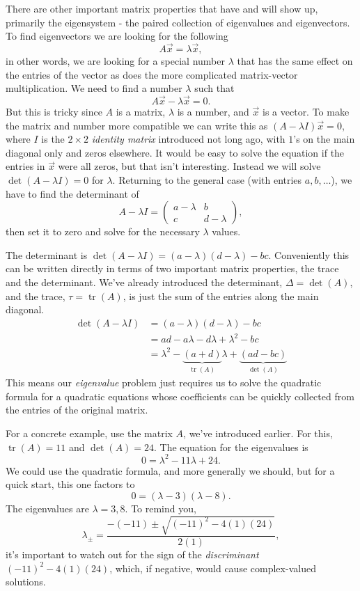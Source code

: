\documentclass{article}
\begin{document}
There are other important matrix properties that have and will show up, primarily the eigensystem - the paired collection of eigenvalues and eigenvectors.  To find eigenvectors we are looking for the following \[A\vec{x} = \lambda \vec{x},\] in other words, we are looking for a special number \(\lambda\) that has the same effect on the entries of the vector as does the more complicated matrix-vector multiplication.  We need to find a number \(\lambda\) such that \[A\vec{x} - \lambda\vec{x} = 0.\] But this is tricky since \(A\) is a matrix, \(\lambda\) is a number, and \(\vec{x}\) is a vector.  To make the matrix and number more compatible we can write this as \((A - \lambda I)\vec{x} = 0\), where \(I\) is the \(2\times2\) \emph{identity matrix}  introduced not long ago, with \(1\)'s on the main diagonal only and zeros elsewhere.  It would be easy to solve the equation if the entries in \(\vec{x}\) were all zeros, but that isn't interesting.  Instead we will solve \(\operatorname{det}(A-\lambda I) =0\) for \(\lambda\).  Returning to the general case (with entries \(a, b, \dots\)), we have to find the determinant of \[A-\lambda I = \begin{pmatrix}a - \lambda & b\\c & d - \lambda \end{pmatrix},\] then set it to zero and solve for the necessary \(\lambda\) values.

The determinant is \(\operatorname{det}(A-\lambda I) = (a-\lambda)(d-\lambda)-bc\).  Conveniently this can be written directly in terms of two important matrix properties, the trace and the determinant.  We've already introduced the determinant, \(\Delta = \operatorname{det}(A)\), and the trace, \(\tau = \operatorname{tr}(A)\), is just the sum of the entries along the main diagonal.  
\begin{align*}
\operatorname{det}(A-\lambda I) &= (a-\lambda)(d-\lambda)-bc\\
&= ad - a\lambda -d\lambda+ \lambda^2-bc\\
&=\lambda^2 - \underbrace{(a+d)}_{\operatorname{tr}(A)}\lambda + \underbrace{(ad-bc)}_{\operatorname{det}(A)}
\end{align*}
This means our \emph{eigenvalue} problem just requires us to solve the quadratic formula for a quadratic equations whose coefficients can be quickly collected from the entries of the original matrix.

For a concrete example, use the matrix \(A\), we've introduced earlier. For this, \(\operatorname{tr}(A) = 11\) and \(\operatorname{det}(A) = 24\).  The equation for the eigenvalues is \[0 = \lambda^2 - 11\lambda + 24.\] We could use the quadratic formula, and more generally we should, but for a quick start, this one factors to \[0 = (\lambda - 3)(\lambda-8).\] The eigenvalues are \(\lambda = 3, 8\).  To remind you, \[\lambda_{\pm} = \frac{-(-11)\pm\sqrt{(-11)^2 - 4(1)(24)}}{2(1)},\] it's important to watch out for the sign of the \emph{discriminant} \((-11)^2 - 4(1)(24)\), which, if negative, would cause complex-valued solutions.
\end{document}
